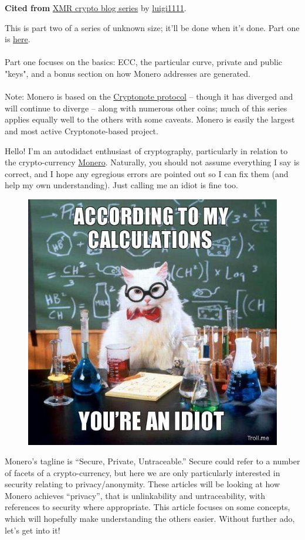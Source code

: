 \textbf{Cited from} \href{https://steemit.com/monero/@luigi1111/understanding-monero-cryptography-privacy-introduction}{XMR crypto blog series} by \href{https://github.com/luigi1111}{luigi1111}.\par

\begin{displayquote}
This is part two of a series of unknown size; it'll be done when it's done. Part one is \href{https://steemit.com/monero/@luigi1111/understanding-monero-cryptography-privacy-introduction}{here}.\\\\
Part one focuses on the basics: ECC, the particular curve, private and public "keys", and a bonus section on how Monero addresses are generated. \\\\
Note: Monero is based on the \href{https://cryptonote.org/whitepaper.pdf}{Cryptonote protocol} -- though it has diverged and will continue to diverge -- along with numerous other coins; much of this series applies equally well to the others with some caveats. Monero is easily the largest and most active Cryptonote-based project.
\end{displayquote}

Hello! I'm an autodidact enthusiast of cryptography, particularly in relation to the crypto-currency \href{https://getmonero.org/}{Monero}. Naturally, you should not assume everything I say is correct, and I hope any egregious errors are pointed out so I can fix them (and help my own understanding). Just calling me an idiot is fine too.

\begin{figure}[H]
	\centering
	\includegraphics[width=0.4\linewidth]{./images/blog-series/xmr-crypto-luigi1111/idiot-doctor.jpg}
\end{figure}

Monero's tagline is ``Secure, Private, Untraceable.'' Secure could refer to a number of facets of a crypto-currency, but here we are only particularly interested in security relating to privacy/anonymity. These articles will be looking at how Monero achieves ``privacy'', that is unlinkability and untraceability, with references to security where appropriate. This article focuses on some concepts, which will hopefully make understanding the others easier. Without further ado, let's get into it!

